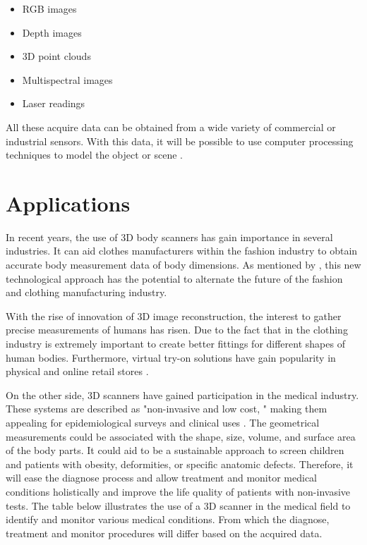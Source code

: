 \documentclass[12pt]{report}
\begin{document}
\begin{itemize}[]
  \itemsep0em 
     \item RGB images
     \item Depth images
     \item 3D point clouds 
     \item Multispectral images
     \item Laser readings
\end{itemize}
All these acquire data can be obtained from a wide variety of commercial or industrial sensors. With this data, it will be possible to use computer processing techniques  to model the object or scene \citep*{murcia_monroy_mora_2018}.

\section{Applications}
In recent years, the use of 3D body scanners has gain importance in several industries. It can aid clothes manufacturers within the fashion industry to obtain accurate body measurement data of body dimensions.
As mentioned by \citet*{sturm_bylow_kahl_cremers_2013}, this new technological approach has the potential to alternate the future of the fashion and clothing manufacturing industry.

With the rise of innovation of 3D image reconstruction, the interest to gather precise measurements of humans has risen. Due to the fact that in the clothing industry
is extremely important to create better fittings for different shapes of human bodies. 
Furthermore, virtual try-on solutions have gain popularity in physical and online retail stores .

On the other side, 3D scanners have gained participation in the medical industry. These systems are described as "non-invasive and low cost, " making them appealing for epidemiological surveys and clinical uses .
The geometrical measurements could be associated with the shape, size, volume, and surface area of the body parts. It could aid to be a sustainable approach to screen children and patients with obesity, deformities, or specific anatomic defects. 
Therefore, it will ease the diagnose process and allow treatment and monitor medical conditions holistically and improve the life quality of patients with non-invasive tests.
The table below illustrates the use of a 3D scanner in the medical field to identify and monitor various medical conditions. 
From which the diagnose, treatment and monitor procedures will differ based on the acquired data.
\end{document}
